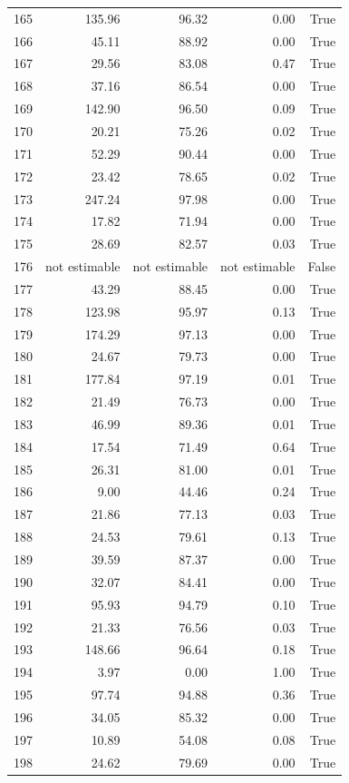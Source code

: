 \begin{longtable}{rrrrr}
165 & 135.96 & 96.32 & 0.00 & True \\
166 & 45.11 & 88.92 & 0.00 & True \\
167 & 29.56 & 83.08 & 0.47 & True \\
168 & 37.16 & 86.54 & 0.00 & True \\
169 & 142.90 & 96.50 & 0.09 & True \\
170 & 20.21 & 75.26 & 0.02 & True \\
171 & 52.29 & 90.44 & 0.00 & True \\
172 & 23.42 & 78.65 & 0.02 & True \\
173 & 247.24 & 97.98 & 0.00 & True \\
174 & 17.82 & 71.94 & 0.00 & True \\
175 & 28.69 & 82.57 & 0.03 & True \\
176 & not estimable & not estimable & not estimable & False \\
177 & 43.29 & 88.45 & 0.00 & True \\
178 & 123.98 & 95.97 & 0.13 & True \\
179 & 174.29 & 97.13 & 0.00 & True \\
180 & 24.67 & 79.73 & 0.00 & True \\
181 & 177.84 & 97.19 & 0.01 & True \\
182 & 21.49 & 76.73 & 0.00 & True \\
183 & 46.99 & 89.36 & 0.01 & True \\
184 & 17.54 & 71.49 & 0.64 & True \\
185 & 26.31 & 81.00 & 0.01 & True \\
186 & 9.00 & 44.46 & 0.24 & True \\
187 & 21.86 & 77.13 & 0.03 & True \\
188 & 24.53 & 79.61 & 0.13 & True \\
189 & 39.59 & 87.37 & 0.00 & True \\
190 & 32.07 & 84.41 & 0.00 & True \\
191 & 95.93 & 94.79 & 0.10 & True \\
192 & 21.33 & 76.56 & 0.03 & True \\
193 & 148.66 & 96.64 & 0.18 & True \\
194 & 3.97 & 0.00 & 1.00 & True \\
195 & 97.74 & 94.88 & 0.36 & True \\
196 & 34.05 & 85.32 & 0.00 & True \\
197 & 10.89 & 54.08 & 0.08 & True \\
198 & 24.62 & 79.69 & 0.00 & True \\

\end{longtable}
